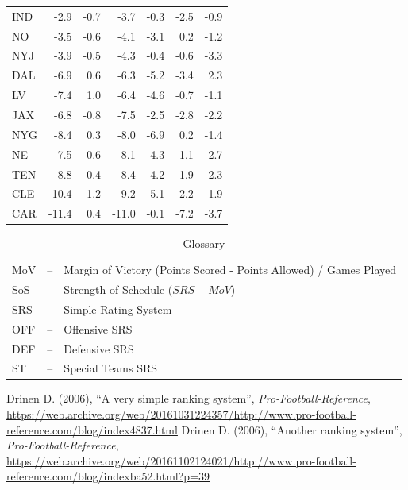 \documentclass{report}
\begin{document}
\begin{table}[ht]
\begin{tabular}{ | l | r r r r r r | }
        IND & -2.9 & -0.7 & -3.7 & -0.3 & -2.5 & -0.9 \\
        NO & -3.5 & -0.6 & -4.1 & -3.1 & 0.2 & -1.2 \\
        NYJ & -3.9 & -0.5 & -4.3 & -0.4 & -0.6 & -3.3 \\
        DAL & -6.9 & 0.6 & -6.3 & -5.2 & -3.4 & 2.3 \\
        LV & -7.4 & 1.0 & -6.4 & -4.6 & -0.7 & -1.1 \\
        JAX & -6.8 & -0.8 & -7.5 & -2.5 & -2.8 & -2.2 \\
        NYG & -8.4 & 0.3 & -8.0 & -6.9 & 0.2 & -1.4 \\
        NE & -7.5 & -0.6 & -8.1 & -4.3 & -1.1 & -2.7 \\
        TEN & -8.8 & 0.4 & -8.4 & -4.2 & -1.9 & -2.3 \\
        CLE & -10.4 & 1.2 & -9.2 & -5.1 & -2.2 & -1.9 \\
        CAR & -11.4 & 0.4 & -11.0 & -0.1 & -7.2 & -3.7 \\
        \hline
        \hline
    \end{tabular}
\end{table}

\begin{table}[ht]
    \centering
    \caption*{Glossary}
    \begin{tabular}{l c l}
        \hline
        MoV & -- & Margin of Victory (Points Scored - Points Allowed) / Games Played\\
        SoS & -- & Strength of Schedule ($SRS - MoV$) \\
        SRS & -- & Simple Rating System \\
        OFF & -- & Offensive SRS \\
        DEF & -- & Defensive SRS \\
        ST & -- & Special Teams SRS \\
        \hline
    \end{tabular}
\end{table}

\begin{thebibliography}{9}
     Drinen D. (2006), ``A very simple ranking system'', \textit{Pro-Football-Reference}, \url{https://web.archive.org/web/20161031224357/http://www.pro-football-reference.com/blog/index4837.html}
     Drinen D. (2006), ``Another ranking system'', \textit{Pro-Football-Reference}, \url{https://web.archive.org/web/20161102124021/http://www.pro-football-reference.com/blog/indexba52.html?p=39}
\end{thebibliography}
\end{document}
